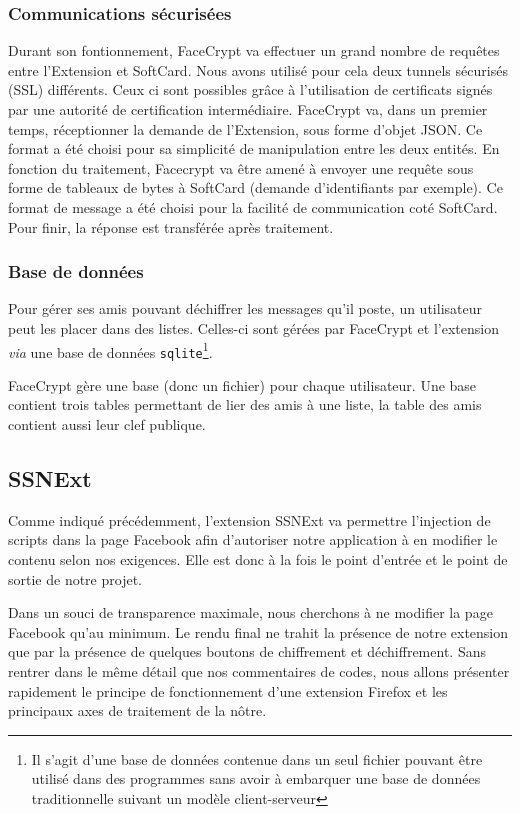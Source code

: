 \documentclass[a4paper,11pt,french]{article}
\begin{document}
\subsubsection{Communications sécurisées}
Durant son fontionnement, FaceCrypt va effectuer un grand nombre de requêtes
entre l'Extension et SoftCard. Nous avons utilisé pour cela deux tunnels
sécurisés (SSL) différents. Ceux ci sont possibles grâce à l'utilisation de
certificats signés par une autorité de certification intermédiaire. FaceCrypt
va, dans un premier temps, réceptionner la demande de l'Extension, sous forme
d'objet JSON. Ce format a été choisi pour sa simplicité de manipulation entre
les deux entités. En fonction du traitement, Facecrypt va être amené à envoyer
une requête sous forme de tableaux de bytes à SoftCard (demande d'identifiants
par exemple). Ce format de message a été choisi pour la facilité de 
communication coté SoftCard. Pour finir, la réponse est transférée après
traitement.

\subsubsection{Base de données}
Pour gérer ses amis pouvant déchiffrer les messages qu'il poste, un utilisateur
peut les placer dans des listes. Celles-ci sont gérées par FaceCrypt et 
l'extension \emph{via} une base de données \texttt{sqlite}\footnote{Il s'agit
d'une base de données contenue dans un seul fichier pouvant être utilisé dans 
des programmes sans avoir à embarquer une base de données traditionnelle suivant
un modèle client-serveur}. 

FaceCrypt gère une base (donc un fichier) pour chaque utilisateur. Une base 
contient trois tables permettant de lier des amis à une liste, la table des 
amis contient aussi leur clef publique.

\subsection{SSNExt} 
Comme indiqué précédemment, l'extension SSNExt va permettre l'injection de 
scripts dans la page Facebook afin d'autoriser notre application à en modifier 
le contenu selon nos exigences. Elle est donc à la fois le point d'entrée et 
le point de sortie de notre projet. 

Dans un souci de transparence maximale, nous cherchons à ne modifier la page 
Facebook qu'au minimum. Le rendu final ne trahit la présence de notre extension 
que par la présence de quelques boutons de chiffrement et déchiffrement. Sans 
rentrer dans le même détail que nos commentaires de codes, nous allons présenter 
rapidement le principe de fonctionnement d'une extension Firefox et les principaux 
axes de traitement de la nôtre.
\end{document}
